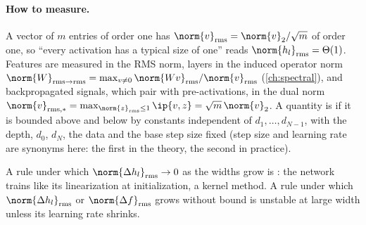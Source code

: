 \begin{refsection}
\paragraph{How to measure.} A vector of $m$ entries of order one has  $\norm{v}_\rms=\norm{v}_2/\sqrt m$ of order one, so ``every activation has a typical size of one'' reads $\norm{h_l}_\rms=\Theta(1)$. Features are measured in the RMS norm, layers in the induced operator norm $\norm{W}_{\rms\to\rms}=\max_{v\ne0}\norm{Wv}_\rms/\norm{v}_\rms$ (\cref{ch:spectral}), and backpropagated signals, which pair with pre-activations, in the dual norm $\norm{v}_{\rms,*}=\max_{\norm{z}_\rms\le1}\ip{v,z}=\sqrt m\,\norm{v}_2$. A quantity is  if it is bounded above and below by constants independent of $d_1,\dots,d_{N-1}$, with the depth, $d_0$, $d_N$, the data and the base step size fixed (step size and learning rate are synonyms here: the first in the theory, the second in practice).



A rule under which $\norm{\Delta h_l}_\rms\to0$ as the widths grow is : the network trains like its linearization at initialization, a kernel method. A rule under which $\norm{\Delta h_l}_\rms$ or $\norm{\Delta f}_\rms$ grows without bound is unstable at large width unless its learning rate shrinks.


\end{refsection}

